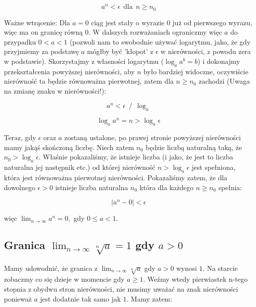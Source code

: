\documentclass[a4paper,oneside,openright,11pt]{article}
\numberwithin{equation}{section}
\begin{document}
\begin{equation*}
    a^{n}  < \epsilon \ \ \textrm{dla} \ \ n \geq n_0
\end{equation*}

\noindent
Ważne wtrącenie: Dla $a = 0$ ciąg jest stały o wyrazie $0$ już od pierwszego wyrazu, więc ma on granicę równą $0$. W dalszych rozważaniach ograniczmy więc $a$ do przypadku $0 < a < 1$ (pozwoli nam to swobodnie używać
logarytmu, jako, że gdy przyjmiemy za podstawę $a$ mógłby być 'kłopot' z $\epsilon$ w nierówności, z powodu zera w podstawie).
Skorzystajmy z własności logarytmu ($\log _{a} a^b = b$) i dokonajmy przekształcenia powyższej nierówności, aby $n$ było bardziej widoczne, oczywiście
nierówność ta będzie równoważna pierwotnej, zatem dla $n \geq n_0$ zachodzi (Uwaga na zmianę znaku w nierówności!):

\begin{equation*}
    a^{n}  < \epsilon \ \ / \ \ \log _{a}
\end{equation*}

\begin{equation*}
    \log _{a} a^{n} = n > \log _{a} \epsilon 
\end{equation*}

\noindent
Teraz, gdy $\epsilon$ oraz $a$ zostaną ustalone, po prawej stronie powyższej nierówności mamy jakąś skończoną liczbę.
Niech zatem $n_0$ będzie liczbą naturalną taką, że $n_0 > \log _{a} \epsilon$. Właśnie pokazaliśmy, że istnieje liczba (i jako, że jest to liczba naturalna jej następnik etc.) od której
nierówność $n > \log _{a} \epsilon$ jest spełniona, która jest równoważna pierwotnej nierówności. Pokazaliśmy zatem, że dla dowolnego $\epsilon > 0$ istnieje liczba naturalna $n_0$ która dla każdego $n \geq n_0$
spełnia:


\begin{equation*}
    |a^{n} - 0| < \epsilon
\end{equation*}

\vspace{10mm}


więc $\lim_{n\to\infty} a^{n} = 0,$ gdy $0 \leq a < 1$.


\subsection{Granica $\lim_{n\to\infty} \sqrt[n]{a} = 1$ gdy $a > 0$} \label{RudnickiWzor16}

Mamy udowodnić, że granica z $\lim_{n\to\infty} \sqrt[n]{a}$ gdy $a > 0$ wynosi $1$. Na starcie zobaczmy co się dzieje w momencie
gdy $a \geq 1$. Weźmy wtedy pierwiastek n-tego stopnia z obydwu stron nierówności, nie musimy uważać na znak nierówności ponieważ $a$ jest dodatnie tak samo jak $1$.
Mamy zatem:
\end{document}
